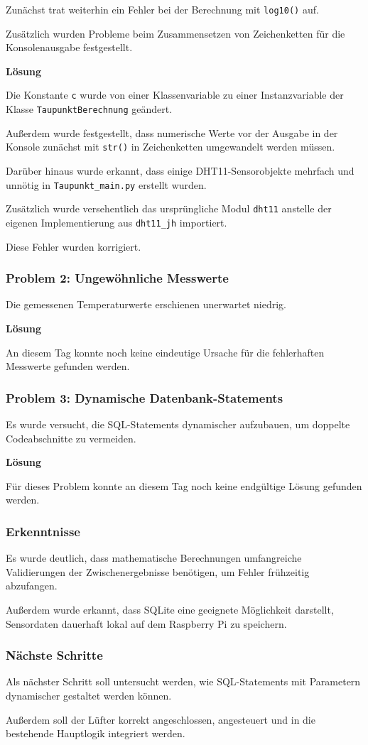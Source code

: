 Zunächst trat weiterhin ein Fehler bei der
Berechnung mit \texttt{log10()} auf.

Zusätzlich wurden Probleme beim Zusammensetzen
von Zeichenketten für die Konsolenausgabe
festgestellt.

\textbf{Lösung}

Die Konstante \texttt{c} wurde von einer
Klassenvariable zu einer Instanzvariable der
Klasse \texttt{TaupunktBerechnung} geändert.

Außerdem wurde festgestellt, dass numerische
Werte vor der Ausgabe in der Konsole zunächst
mit \texttt{str()} in Zeichenketten umgewandelt
werden müssen.

Darüber hinaus wurde erkannt, dass einige
DHT11-Sensorobjekte mehrfach und unnötig in
\texttt{Taupunkt\_main.py} erstellt wurden.

Zusätzlich wurde versehentlich das ursprüngliche
Modul \texttt{dht11} anstelle der eigenen
Implementierung aus \texttt{dht11\_jh}
importiert.

Diese Fehler wurden korrigiert.

\subsubsection{Problem 2: Ungewöhnliche Messwerte}

Die gemessenen Temperaturwerte erschienen
unerwartet niedrig.

\textbf{Lösung}

An diesem Tag konnte noch keine eindeutige
Ursache für die fehlerhaften Messwerte gefunden
werden.

\subsubsection{Problem 3: Dynamische Datenbank-Statements}

Es wurde versucht, die SQL-Statements dynamischer
aufzubauen, um doppelte Codeabschnitte zu vermeiden.

\textbf{Lösung}

Für dieses Problem konnte an diesem Tag noch
keine endgültige Lösung gefunden werden.

\subsubsection{Erkenntnisse}

Es wurde deutlich, dass mathematische
Berechnungen umfangreiche Validierungen der
Zwischenergebnisse benötigen, um Fehler frühzeitig
abzufangen.

Außerdem wurde erkannt, dass SQLite eine
geeignete Möglichkeit darstellt, Sensordaten
dauerhaft lokal auf dem Raspberry Pi zu speichern.

\subsubsection{Nächste Schritte}

Als nächster Schritt soll untersucht werden,
wie SQL-Statements mit Parametern dynamischer
gestaltet werden können.

Außerdem soll der Lüfter korrekt angeschlossen,
angesteuert und in die bestehende Hauptlogik
integriert werden.